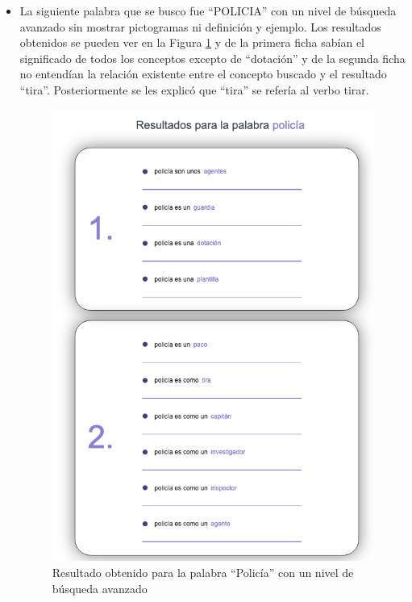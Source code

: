 \begin{itemize}
	
	\item La siguiente palabra que se busco fue ``POLICIA'' con un nivel de búsqueda avanzado sin mostrar pictogramas ni definición y ejemplo. Los resultados obtenidos se pueden ver en la Figura \ref{fig:policiaAvanzado} y de la primera ficha sabían el significado de todos los conceptos excepto de ``dotación'' y de la segunda ficha no entendían la relación existente entre el concepto buscado y el resultado ``tira''. Posteriormente se les explicó que ``tira'' se refería al verbo tirar.
	\begin{figure}[!h]
		\includegraphics[width=.7\textwidth]{Imagenes/Bitmap/Capitulo4/EvaluacionFinal/5policiaavanzado.png}
		\centering
		\caption{Resultado obtenido para la palabra ``Policía'' con un nivel de búsqueda avanzado}
		\label{fig:policiaAvanzado}
	\end{figure}


\end{itemize}
